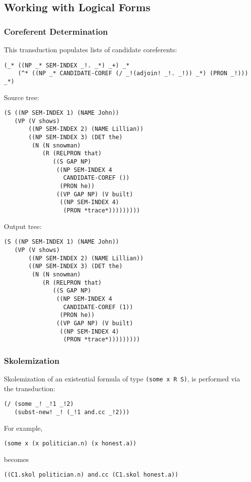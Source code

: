 \documentclass[8pt]{beamer}
\begin{document}
\subsection{Working with Logical Forms}
\begin{frame}[fragile]
  \frametitle{Coreferent Determination}
This transduction populates lists of candidate coreferents:
\begin{verbatim}
(_* ((NP _* SEM-INDEX _!. _*) _+) _* 
    (^* ((NP _* CANDIDATE-COREF (/ _!(adjoin! _!. _!)) _*) (PRON _!))) _*)
\end{verbatim}
\begin{multicols}{2}
Source tree:
\begin{verbatim}
(S ((NP SEM-INDEX 1) (NAME John))
   (VP (V shows) 
       ((NP SEM-INDEX 2) (NAME Lillian))
       ((NP SEM-INDEX 3) (DET the)
        (N (N snowman)
           (R (RELPRON that)
              ((S GAP NP)
               ((NP SEM-INDEX 4 
                 CANDIDATE-COREF ())
                (PRON he))
               ((VP GAP NP) (V built)
                ((NP SEM-INDEX 4) 
                 (PRON *trace*)))))))))
\end{verbatim} 


Output tree:
\begin{verbatim}
(S ((NP SEM-INDEX 1) (NAME John))
   (VP (V shows) 
       ((NP SEM-INDEX 2) (NAME Lillian))
       ((NP SEM-INDEX 3) (DET the)
        (N (N snowman)
           (R (RELPRON that)
              ((S GAP NP)
               ((NP SEM-INDEX 4 
                 CANDIDATE-COREF (1))
                (PRON he))
               ((VP GAP NP) (V built)
                ((NP SEM-INDEX 4) 
                 (PRON *trace*)))))))))
\end{verbatim}
\end{multicols}
\end{frame}

\begin{frame}[fragile]
  \frametitle{Skolemization}
Skolemization of an existential formula of type \texttt{(some x R S)}, is performed via the transduction:\\
\begin{verbatim}
(/ (some _! _!1 _!2)
   (subst-new! _! (_!1 and.cc _!2)))
\end{verbatim}


For example, 
\begin{verbatim}
(some x (x politician.n) (x honest.a))
\end{verbatim}
becomes
\begin{verbatim}
((C1.skol politician.n) and.cc (C1.skol honest.a))
\end{verbatim}
\end{frame}
\end{document}
